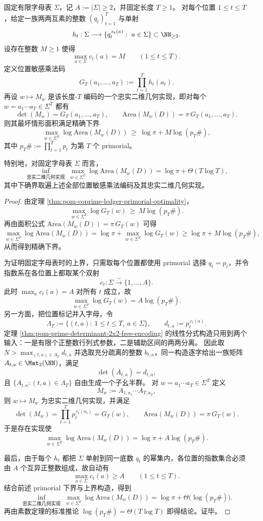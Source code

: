 \begin{theorem}\label{thm:pom-faithful-2x2-geometric-primorial-area-law}
固定有限字母表 \(\Sigma\)，记 \(A:=|\Sigma|\ge 2\)，并固定长度 \(T\ge 1\)。
对每个位置 \(1\le t\le T\)，给定一族两两互素的整数 \((q_t)_{t=1}^{T}\) 与单射
\[
h_t:\Sigma\longrightarrow \{q_t^{\,c_t(a)}:\ a\in\Sigma\}\subset \NN_{\ge 2}.
\]
设存在整数 \(M\ge 1\) 使得
\[
\max_{a\in\Sigma} c_t(a)=M
\qquad (1\le t\le T).
\]
定义位置敏感乘法码
\[
G_T(a_1,\dots,a_T):=\prod_{t=1}^{T}h_t(a_t).
\]
再设 \(w\mapsto M_w\) 是该长度-\(T\) 编码的一个忠实二维几何实现，即对每个 \(w=a_1\cdots a_T\in\Sigma^T\) 都有
\[
\det(M_w)=G_T(a_1,\dots,a_T),
\qquad
\mathrm{Area}(M_w(D))=\pi\,G_T(a_1,\dots,a_T).
\]
则其最坏情形面积满足精确下界
\[
\max_{w\in\Sigma^T}\log \mathrm{Area}(M_w(D))
\ \ge\
\log\pi+M\log(p_T\#),
\]
其中 \(p_T\#:=\prod_{t=1}^{T}p_t\) 为第 \(T\) 个 primorial。

特别地，对固定字母表 \(\Sigma\) 而言，
\[
\inf_{\text{忠实二维几何实现}}
\ \max_{w\in\Sigma^T}\log \mathrm{Area}(M_w(D))
=
\log\pi+\Theta(T\log T),
\]
其中下确界取遍上述全部位置敏感乘法编码及其忠实二维几何实现。
\end{theorem}
\begin{proof}
由定理 \ref{thm:pom-coprime-ledger-primorial-optimality}，
\[
\max_{w\in\Sigma^T}\log G_T(w)\ \ge\ M\log(p_T\#).
\]
再由面积公式
\(
\mathrm{Area}(M_w(D))=\pi\,G_T(w)
\)
可得
\[
\max_{w\in\Sigma^T}\log \mathrm{Area}(M_w(D))
=
\log\pi+\max_{w\in\Sigma^T}\log G_T(w)
\ge
\log\pi+M\log(p_T\#),
\]
从而得到精确下界。

为证明固定字母表时的上界，只需取每个位置都使用 primorial 选择 \(q_t=p_t\)，并令指数系在各位置上都取某个双射
\[
c_t:\Sigma\xrightarrow{\sim}\{1,\dots,A\}.
\]
此时 \(\max_{a}c_t(a)=A\) 对所有 \(t\) 成立，故
\[
\max_{w\in\Sigma^T}\log G_T(w)=A\log(p_T\#).
\]
另一方面，把位置标记并入字母，令
\[
\Lambda_T:=\{(t,a):\ 1\le t\le T,\ a\in\Sigma\},
\qquad
d_{t,a}:=p_t^{\,c_t(a)}.
\]
定理 \ref{thm:pom-prime-determinant-2x2-free-encoding} 的线性分式构造只用到两个输入：一是有限个正整数行列式参数，二是辅助区间的两两分离。
因此取 \(N>\max_{(t,a)\in\Lambda_T}d_{t,a}\) 并选取充分疏离的整数 \(b_{t,a}\)，同一构造逐字给出一族矩阵 \(A_{t,a}\in\Mat_2(\NN)\)，满足
\[
\det(A_{t,a})=d_{t,a},
\]
且 \(\{A_{t,a}:(t,a)\in\Lambda_T\}\) 自由生成一个子幺半群。
对 \(w=a_1\cdots a_T\in\Sigma^T\) 定义
\[
M_w:=A_{1,a_1}\cdots A_{T,a_T},
\]
则 \(w\mapsto M_w\) 为忠实二维几何实现，并满足
\[
\det(M_w)=\prod_{t=1}^{T}p_t^{\,c_t(a_t)}=G_T(w),
\qquad
\mathrm{Area}(M_w(D))=\pi\,G_T(w).
\]
于是存在实现使
\[
\max_{w\in\Sigma^T}\log \mathrm{Area}(M_w(D))
=
\log\pi+A\log(p_T\#).
\]

最后，由于每个 \(h_t\) 都把 \(\Sigma\) 单射到同一底数 \(q_t\) 的幂集内，各位置的指数集合必须由 \(A\) 个互异正整数组成，故自动有
\[
\max_{a\in\Sigma}c_t(a)\ge A
\qquad (1\le t\le T).
\]
结合前述 primorial 下界与上界构造，得到
\[
\inf_{\text{忠实二维几何实现}}
\ \max_{w\in\Sigma^T}\log \mathrm{Area}(M_w(D))
=
\log\pi+\Theta\!\bigl(\log(p_T\#)\bigr).
\]
再由素数定理的标准推论
\(
\log(p_T\#)=\Theta(T\log T)
\)
即得结论。证毕。
\end{proof}

